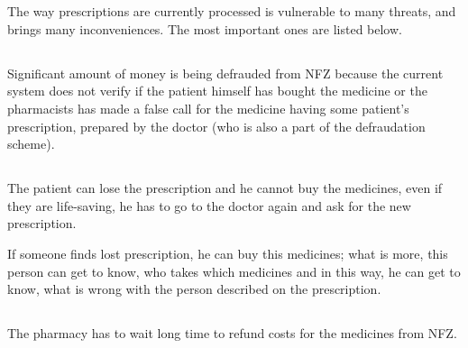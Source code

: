 \chapter{   } \label{ti}

The way prescriptions are currently processed is vulnerable to many threats, and brings many inconveniences. The most important ones are listed below.

\section{}

\subsection{}

Significant amount of money is being defrauded from NFZ because the
current system does not verify if the patient himself has bought the
medicine or the pharmacists has made a false call for the medicine
having some patient's prescription, prepared by the doctor (who is
also a part of the defraudation scheme).

\section{}

\subsection{}
The patient can lose the prescription and he cannot buy the medicines,
even if they are life-saving, he has to go to the doctor again and
ask for the new prescription.

If someone finds lost prescription, he can buy this medicines; what is more, this person
can get to know, who takes which medicines and in this way, he can
get to know, what is wrong with the person described on the prescription.

\section{}

\subsection{}
The pharmacy has to wait long time to refund costs for the medicines
from NFZ.

